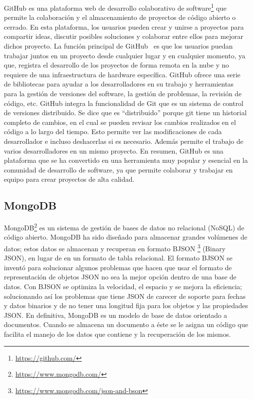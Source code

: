\documentclass[a4paper, 12pt]{book}
\begin{document}
GitHub es una plataforma web de desarrollo colaborativo de software\footnote{\url{https://github.com/}} que permite la colaboración y el almacenamiento de proyectos de código abierto o cerrado.
En esta plataforma, los usuarios pueden crear y unirse a proyectos para compartir ideas, discutir posibles soluciones y colaborar entre ellos para mejorar dichos proyecto.
La función principal de GitHub~\cite{astigarraga2022se} es que los usuarios puedan trabajar juntos en un proyecto desde cualquier lugar y en cualquier momento, ya que, registra el desarrollo de los proyectos de forma remota en la nube y no requiere de una infraestructura de hardware específica.
GitHub ofrece una serie de bibliotecas para ayudar a los desarrolladores en su trabajo y herramientas para la gestión de versiones del software, la gestión de problemas, la revisión de código, etc. 
GitHub integra la funcionalidad de Git que es un sistema de control de versiones distribuido.
Se dice que es ``distribuido'' porque git tiene un historial completo de cambios, en el cual se pueden revisar los cambios realizados en el código a lo largo del tiempo. 
Esto permite ver las modificaciones de cada desarrollador e incluso deshacerlas si es necesario. Además permite el trabajo de varios desarrolladores en un mismo proyecto.
En resumen, GitHub es una plataforma que se ha convertido en una herramienta muy popular y esencial en la comunidad de desarrollo de software, ya que permite colaborar y trabajar en equipo para crear proyectos de alta calidad.
 

\subsection{MongoDB} %
\label{sec:mongodb} %

MongoDB\footnote{\url{https://www.mongodb.com/}} es un sistema de gestión de bases de datos no relacional (NoSQL) de código abierto. 
MongoDB ha sido diseñado para almacenar grandes volúmenes de datos; estos datos se almacenan y recuperan en formato BJSON \footnote{\url{https://www.mongodb.com/json-and-bson}} (Binary JSON), en lugar de en un formato de tabla relacional.
El formato BJSON se inventó para solucionar algunos problemas que hacen que usar el formato de representación de objetos JSON no sea la mejor opción dentro de una base de datos. 
Con BJSON se optimiza la velocidad, el espacio y se mejora la eficiencia; solucionando así los problemas que tiene JSON de carecer de soporte para fechas y datos binarios y de no tener una longitud fija para los objetos y las propiedades JSON.
En definitiva, MongoDB es un modelo de base de datos orientado a documentos. Cuando se almacena un documento a éste se le asigna un código que facilita el manejo de los datos que contiene y la recuperación de los mismos.
\end{document}
